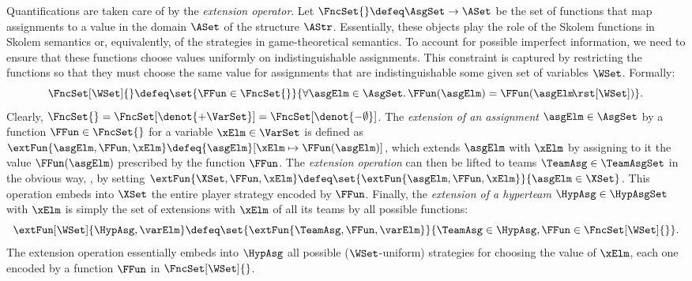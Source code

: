 \documentclass[authoryear]{elsarticle}
\begin{document}
Quantifications are taken care of by the \emph{extension operator}.
Let $\FncSet{} \defeq \AsgSet \to \ASet$ be the set of functions that map
assignments to a value in the domain $\ASet$ of the structure
$\AStr$.
Essentially, these objects play the role of the Skolem functions in Skolem
semantics or, equivalently, of the strategies in game-theoretical semantics.
To account for possible imperfect information, we need to ensure that these
functions choose values uniformly on indistinguishable assignments.
This constraint is captured by restricting the functions so that they must
choose the same value for assignments that are indistinguishable \wrt some given
set of variables $\WSet$.
Formally:
\[
  \FncSet[\WSet]{} \defeq \set{ \FFun \in \FncSet{} }{ \forall \asgElm \in
  \AsgSet \ldotp \FFun(\asgElm) = \FFun(\asgElm \!\rst[\WSet]) }.
\]
Clearly, $\FncSet{} = \FncSet[\denot{+\VarSet}]{} =
\FncSet[\denot{-\emptyset}]{}$.
The \emph{extension of an assignment} $\asgElm \in \AsgSet$ by a function $\FFun
\in \FncSet{}$ for a variable $\xElm \in \VarSet$ is defined as
$\extFun{\asgElm, \FFun, \xElm} \defeq {\asgElm}[\xElm \mapsto \FFun(\asgElm)]$,
which extends $\asgElm$ with $\xElm$ by assigning to it the value
$\FFun(\asgElm)$ prescribed by the function $\FFun$.
The \emph{extension operation} can then be lifted to teams $\TeamAsg \in
\TeamAsgSet$ in the obvious way, \ie, by setting $\extFun{\XSet, \FFun,
\xElm} \defeq \set{ \extFun{\asgElm, \FFun, \xElm} }{ \asgElm \in \XSet }$.
This operation embeds into $\XSet$ the entire player strategy encoded by
$\FFun$.
Finally, the \emph{extension of a hyperteam} $\HypAsg \in \HypAsgSet$
with $\xElm$ is simply the set of extensions with $\xElm$ of all its teams by
all possible functions:
\[
  \extFun[\WSet]{\HypAsg, \varElm} \defeq \set{ \extFun{\TeamAsg, \FFun,
  \varElm} }{ \TeamAsg \in \HypAsg, \FFun \in \FncSet[\WSet]{} }.
\]
The extension operation essentially embeds into $\HypAsg$ all possible
($\WSet$-uniform) strategies for choosing the value of $\xElm$, each one encoded
by a function $\FFun$ in $\FncSet[\WSet]{}$.
\end{document}
